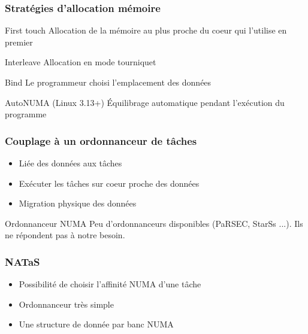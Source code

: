 \documentclass{beamer}
\begin{document}
\begin{frame}
  \frametitle{Stratégies d'allocation mémoire}

  \begin{block}{First touch}
    Allocation de la mémoire au plus proche du coeur qui l'utilise en premier
  \end{block}

  \pause

  \begin{block}{Interleave}
    Allocation en mode tourniquet
  \end{block}

  \pause

  \begin{block}{Bind}
    Le programmeur choisi l'emplacement des données
  \end{block}

  \pause

  \begin{block}{AutoNUMA (Linux 3.13+)}
    \'Equilibrage automatique pendant l'exécution du programme
  \end{block}

\end{frame}


\begin{frame}
  \frametitle{Couplage à un ordonnanceur de tâches}

  \begin{itemize}
    \item Liée des données aux tâches
    \item Exécuter les tâches sur coeur proche des données
    \item Migration physique des données
  \end{itemize}

  \pause

  \begin{alertblock}{Ordonnanceur NUMA}
    Peu d'ordonnanceurs disponibles (PaRSEC, StarSs ...). Ils ne répondent pas à notre besoin.
  \end{alertblock}

\end{frame}



\begin{frame}
  \frametitle{NATaS}

  \begin{itemize}
    \item Possibilité de choisir l'affinité NUMA d'une tâche
    \item Ordonnanceur très simple
    \item Une structure de donnée par banc NUMA
  \end{itemize}

\end{frame}
\end{document}
